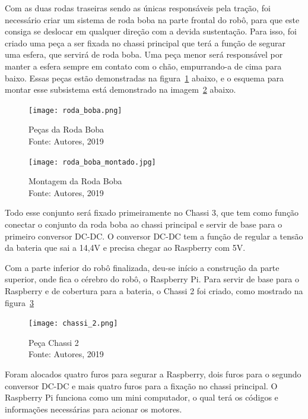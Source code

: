 Com as duas rodas traseiras sendo as únicas responsáveis pela tração, foi necessário criar um sistema de roda boba na parte frontal do robô, para que este consiga se deslocar em qualquer direção com a devida sustentação. Para isso, foi criado uma peça
a ser fixada no chassi principal que terá a função de segurar uma esfera, que servirá de roda boba. Uma peça menor será responsável por manter a esfera sempre em contato com o chão, empurrando-a de cima para baixo. Essas peças estão demonstradas na figura~\ref{fig:roda_boba} abaixo, e o esquema para montar esse subsistema está demonstrado na imagem~\ref{fig:roda_boba_montado} abaixo.

\begin{figure}[h!]
	\centering
	\texttt{[image: roda\_boba.png]}\\
	\caption{Peças da Roda Boba \\ Fonte: Autores, 2019}
	\label{fig:roda_boba}
\end{figure}

\begin{figure}[h!]
	\centering
	\texttt{[image: roda\_boba\_montado.jpg]}\\
	\caption{Montagem da Roda Boba \\ Fonte: Autores, 2019}
	\label{fig:roda_boba_montado}
\end{figure}

Todo esse conjunto será fixado primeiramente no Chassi 3, que tem como função conectar o conjunto da roda boba ao chassi principal e servir de base para o primeiro conversor DC-DC. O conversor DC-DC tem a função de regular a tensão da bateria que sai a 14,4V e precisa chegar ao Raspberry com 5V.

Com a parte inferior do robô finalizada, deu-se início a construção da parte superior, onde fica o cérebro do robô, o Raspberry Pi. Para servir de base para o Raspberry e de cobertura para a bateria, o Chassi 2 foi criado, como mostrado na figura~\ref{fig:chassi_2}

\begin{figure}[h!]
	\centering
	\texttt{[image: chassi\_2.png]}\\
	\caption{Peça Chassi 2 \\ Fonte: Autores, 2019}
	\label{fig:chassi_2}
\end{figure}

Foram alocados quatro furos para segurar a Raspberry, dois furos para o segundo conversor DC-DC e mais quatro furos para a fixação no chassi principal. O Raspberry Pi funciona como um mini computador, o qual terá os códigos e informações necessárias para acionar os
motores.

